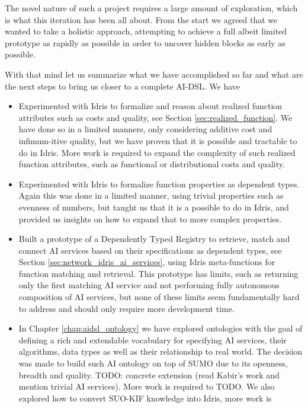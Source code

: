 \documentclass[]{report}
\newcommand{\nil}[2][]{\todo[color=purple,author=nil, #1]{#2}}
\begin{document}
The novel nature of such a project requires a large amount of
exploration, which is what this iteration has been all about.  From
the start we agreed that we wanted to take a holistic approach, attempting
to achieve a full albeit limited prototype as rapidly as possible in
order to uncover hidden blocks as early as possible.

With that mind let us summarize what we have accomplished so far and
what are the next steps to bring us closer to a complete AI-DSL.  We
have
\begin{itemize}
\item Experimented with Idris to formalize and reason about realized
  function attributes such as costs and quality, see Section
  \ref{sec:realized_function}.  We have done so in a limited manners, only
  considering additive cost and infimum-itive quality, but we have
  proven that it is possible and tractable to do in Idris.  More work
  is required to expand the complexity of such realized function
  attributes, such as functional or distributional costs and quality.
\item Experimented with Idris to formalize function properties as
  dependent types\nil{Ref to Sam's work}.  Again this was done in a
  limited manner, using trivial properties such as evenness of
  numbers, but taught us that it is a possible to do in Idris, and
  provided us insights on how to expand that to more complex
  properties.
\item Built a prototype of a Dependently Typed Registry to retrieve,
  match and connect AI services based on their specifications as
  dependent types, see Section \ref{sec:network_idris_ai_services}, using Idris
  meta-functions for function matching and retrieval.  This prototype
  has limits, such as returning only the first matching AI service and
  not performing fully autonomous composition of AI services, but none
  of these limits seem fundamentally hard to address and should only
  require more development time.
\item In Chapter \ref{chap:aidsl_ontology} we have explored ontologies
  with the goal of defining a rich and extendable vocabulary for
  specifying AI services, their algorithms, data types as well as
  their relationship to real world.  The decision was made to build
  such AI ontology on top of SUMO due to its openness, breadth and
  quality.  TODO: concrete extension (read Kabir's work and mention
  trivial AI services).  More work is required to TODO.  We also
  explored how to convert SUO-KIF knowledge into Idris, more work is

\end{itemize}
\end{document}
